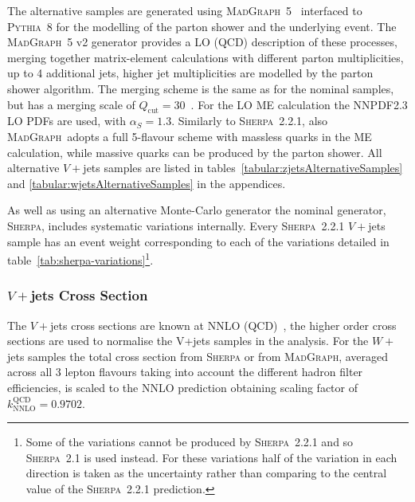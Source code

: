 The alternative samples are generated using
\textsc{MadGraph}~5~\cite{MADGRAPH5_aMC@NLO} interfaced to \textsc{Pythia}~8 for
the modelling of the parton shower and the underlying event. The
\textsc{MadGraph}~5 v2 generator provides a LO (QCD) description of these
processes, merging together matrix-element calculations with different parton
multiplicities, up to 4 additional jets, higher jet multiplicities are modelled
by the parton shower algorithm. The merging scheme is the same as for the nominal samples,
but has a merging scale of $Q_{\text{cut}} = 30$~\GeV. For the LO ME calculation
the NNPDF2.3 LO PDFs are used, with $\alpha_S = 1.3$.  Similarly to
\textsc{Sherpa}~2.2.1, also \textsc{MadGraph}~adopts a full 5-flavour scheme
with massless quarks in the ME calculation, while massive quarks can be produced
by the parton shower. All alternative $V+$jets samples are listed in
tables~\ref{tabular:zjetsAlternativeSamples} and
\ref{tabular:wjetsAlternativeSamples} in the appendices.

As well as using an alternative Monte-Carlo generator the nominal generator,
\textsc{Sherpa}, includes systematic variations internally. Every
\textsc{Sherpa}~2.2.1 $V+$jets sample has an event weight corresponding to each
of the variations detailed in table~\ref{tab:sherpa-variations}\footnote{Some of
the variations cannot be produced by \textsc{Sherpa}~2.2.1 and so
\textsc{Sherpa}~2.1 is used instead. For these variations half of the variation
in each direction is taken as the uncertainty rather than comparing to the
central value of the \textsc{Sherpa}~2.2.1 prediction.}.


\subsubsection{$V+$jets Cross Section}

The $V+$jets cross sections are known at NNLO (QCD)~\cite{Butterworth:1287902},
the higher order cross sections are used to normalise the V+jets samples in the
analysis. For the $W+$jets samples the total cross section from \textsc{Sherpa} or
from \textsc{MadGraph}, averaged across all 3 lepton flavours taking into account the
different hadron filter efficiencies, is scaled to the NNLO prediction obtaining
scaling factor of $k_{\text{NNLO}}^{\text{QCD}} = 0.9702$.

